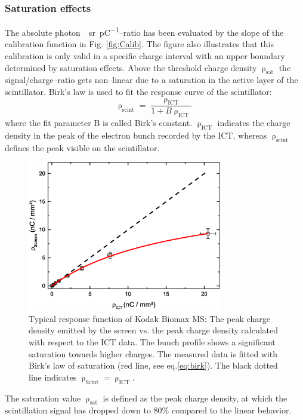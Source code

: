 \documentclass[%
preprint,
amsmath,
amssymb,
aip,
rsi, 
numerical,
floatfix,
]{revtex4-1}
\begin{document}
\subsubsection{\label{Se}Saturation effects}
The absolute \si{photon \per \steradian \per \pico\coulomb}--ratio has been evaluated by the slope of the calibration function in Fig. \ref{fig:Calib}. 
The figure also illustrates that this calibration is only valid in a specific charge interval with an upper boundary determined by saturation effects. 
Above the threshold charge density $\uprho_{\text{sat}}$ the signal/charge--ratio gets non--linear due to a saturation in the active layer of the scintillator.
Birk’s law is used to fit the response curve of the scintillator:
\begin{equation}
\uprho_{\text{scint}} = \frac{\uprho_{\text{ICT}}}{1+B\uprho_{\text{ICT}}}
\label{eq:birk}
\end{equation}
where the fit parameter B is called Birk's constant.
$\uprho_{\text{ICT}}$ indicates the charge density in the peak of the electron bunch recorded by the ICT, whereas $\uprho_{\text{scint}}$ defines the peak visible on the scintillator.
\begin{figure}
\includegraphics[width=8.5cm]{./Figures/Sat}%
\caption{\label{fig:Sat} Typical response function of Kodak Biomax MS: The peak charge density emitted by the screen vs. the peak charge density calculated with respect to the ICT data. 
The bunch profile shows a significant saturation towards higher charges. 
The measured data is fitted with Birk's law of saturation (red line, see eq.\ref{eq:birk}). 
The black dotted line indicates $\uprho_{\text{Scint}} = \uprho_{\text{ICT}}$.}
\end{figure}
The saturation value $\uprho_{\text{sat}}$ is defined as the peak charge density, at which the scintillation signal has dropped down to 80$\%$ compared to the linear behavior.
\end{document}
